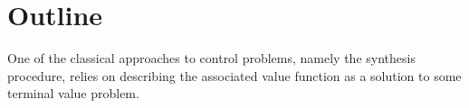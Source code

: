 \chapter*{Outline}

One of the classical approaches to control problems, namely the synthesis procedure, relies on describing the associated value function as a solution to some terminal value problem.

